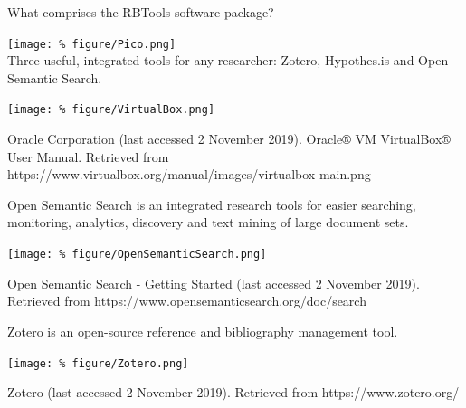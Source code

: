 \documentclass[unknownkeysallowed,usepdftitle=false, parskip=full]{beamer}
\newcommand{\secvariable}{nothing}
\newcommand{\mysection}[1]{\renewcommand{\secvariable}{#1}
}
\begin{document}
\mysection{radar}
\begin{frame}\label{\secvariable}

What comprises the RBTools software package?

\texttt{[image: \%
figure/Pico.png]}\\

Three useful, integrated tools for any researcher: Zotero, Hypothes.is and Open Semantic Search.



  
\end{frame}

\mysection{line}
\begin{frame}\label{\secvariable}
  \texttt{[image: \%
figure/VirtualBox.png]}  

Oracle Corporation (last accessed 2 November 2019). Oracle® VM VirtualBox® User Manual. Retrieved from https://www.virtualbox.org/manual/images/virtualbox-main.png  

\end{frame}

\mysection{major}
\begin{frame}\label{\secvariable} %

Open Semantic Search is an integrated research tools for easier searching, monitoring, analytics, discovery and text mining of large document sets.
  \vspace{0.5cm}

\texttt{[image: \%
figure/OpenSemanticSearch.png]}  

Open Semantic Search - Getting Started (last accessed 2 November 2019). Retrieved from https://www.opensemanticsearch.org/doc/search

\end{frame}

\mysection{slab}
\begin{frame}\label{\secvariable}

Zotero is an open-source reference and bibliography management tool.
  \vspace{0.5cm}

\texttt{[image: \%
figure/Zotero.png]}

Zotero (last accessed 2 November 2019). Retrieved from https://www.zotero.org/


\end{frame}
\end{document}
